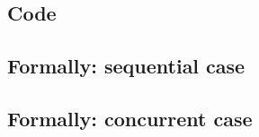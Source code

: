 \documentclass{book}
\begin{document}
  \subsection{Code}

\begin{emptyformal}
  \subsection{Formally: sequential case}

  \subsection{Formally: concurrent case}
\end{emptyformal}




\end{document}
